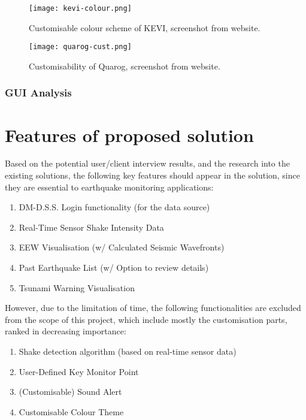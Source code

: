 \begin{figure}[htp]
    \centering

    \texttt{[image: kevi-colour.png]}
    \caption[Customisable colour scheme of KEVI]{Customisable colour scheme of KEVI, screenshot from website.}
    \label{fig:kevi-colour-cust}
\end{figure}

\begin{figure}[htp]
    \centering

    \texttt{[image: quarog-cust.png]}
    \caption[Customisability of Quarog]{Customisability of Quarog, screenshot from website.}
    \label{fig:quarog-cust}
\end{figure}

\subsubsection{GUI Analysis}



\section{Features of proposed solution}

Based on the potential user/client interview results, and the research into the existing solutions, the following key features should appear in the solution, since they are essential to earthquake monitoring applications:
\begin{enumerate}
    \item DM-D.S.S. Login functionality (for the data source)
    \item Real-Time Sensor Shake Intensity Data
    \item EEW Visualisation (w/ Calculated Seismic Wavefronts)
    \item Past Earthquake List (w/ Option to review details)
    \item Tsunami Warning Visualisation
\end{enumerate}

However, due to the limitation of time, the following functionalities are excluded from the scope of this project, which include mostly the customisation parts, ranked in decreasing importance:
\begin{enumerate}
    \item Shake detection algorithm (based on real-time sensor data)
    \item User-Defined Key Monitor Point
    \item (Customisable) Sound Alert
    \item Customisable Colour Theme
\end{enumerate}

